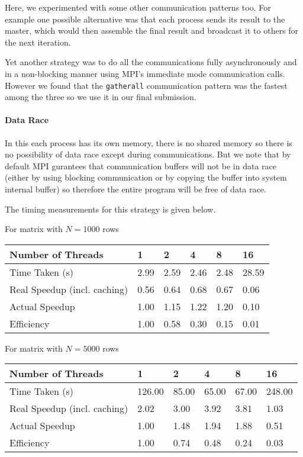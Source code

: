 \documentclass{article}
\begin{document}
Here, we experimented with some other communication patterns too. For example one possible alternative was that each process sends its result to the master, which would then assemble the final result and broadcast it to others for the next iteration.

Yet another strategy was to do all the communications fully asynchronously and in a non-blocking manner using MPI's immediate mode communication calls. However we found that the \verb+gatherall+ communication pattern was the fastest among the three so we use it in our final submission.

\paragraph{Data Race} In this each process has its own memory, there is no shared memory so there is no possibility of data race except during communications. But we note that by default MPI gurantees that communication buffers will not be in data race (either by using blocking communication or by copying the buffer into system internal buffer) so therefore the entire program will be free of data race.

The timing measurements for this strategy is given below.

For matrix with $N=1000$ rows

\begin{table}[H]
\centering
\begin{tabular}{l|lllll}
Number of Threads            & 1    & 2    & 4    & 8    & 16    \\ \hline
Time Taken (s)               & 2.99 & 2.59 & 2.46 & 2.48 & 28.59 \\
Real Speedup (incl. caching) & 0.56 & 0.64 & 0.68 & 0.67 & 0.06  \\
Actual Speedup               & 1.00 & 1.15 & 1.22 & 1.20 & 0.10  \\
Efficiency                   & 1.00 & 0.58 & 0.30 & 0.15 & 0.01 
\end{tabular}
\end{table}

For matrix with $N=5000$ rows

\begin{table}[H]
\centering
\begin{tabular}{l|lllll}
Number of Threads            & 1      & 2     & 4     & 8     & 16     \\ \hline
Time Taken (s)               & 126.00 & 85.00 & 65.00 & 67.00 & 248.00 \\
Real Speedup (incl. caching) & 2.02   & 3.00  & 3.92  & 3.81  & 1.03   \\
Actual Speedup               & 1.00   & 1.48  & 1.94  & 1.88  & 0.51   \\
Efficiency                   & 1.00   & 0.74  & 0.48  & 0.24  & 0.03  
\end{tabular}
\end{table}
\end{document}
